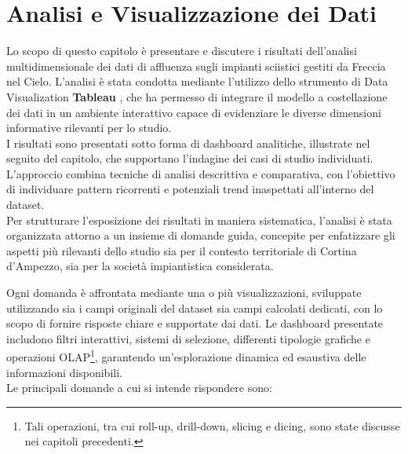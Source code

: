 \chapter{Analisi e Visualizzazione dei Dati}
\label{cha:Analisi}

Lo scopo di questo capitolo è presentare e discutere i risultati dell’analisi multidimensionale dei dati di affluenza sugli impianti sciistici gestiti da Freccia nel Cielo.
L’analisi è stata condotta mediante l’utilizzo dello strumento di Data Visualization \textbf{Tableau} \cite{Tableau}, che ha permesso di integrare il modello a costellazione dei dati in un ambiente interattivo capace di evidenziare le diverse dimensioni informative rilevanti per lo studio.\\

I risultati sono presentati sotto forma di dashboard analitiche, illustrate nel seguito del capitolo, che supportano l’indagine dei casi di studio individuati.
L’approccio combina tecniche di analisi descrittiva e comparativa, con l’obiettivo di individuare pattern ricorrenti e potenziali trend inaspettati all’interno del dataset.\\

Per strutturare l’esposizione dei risultati in maniera sistematica, l’analisi è stata organizzata attorno a un insieme di domande guida, concepite per enfatizzare gli aspetti più rilevanti dello studio sia per il contesto territoriale di Cortina d’Ampezzo, sia per la società impiantistica considerata.

Ogni domanda è affrontata mediante una o più visualizzazioni, sviluppate utilizzando sia i campi originali del dataset sia campi calcolati dedicati, con lo scopo di fornire risposte chiare e supportate dai dati. Le dashboard presentate includono filtri interattivi, sistemi di selezione, differenti tipologie grafiche e operazioni OLAP\footnote{Tali operazioni, tra cui roll-up, drill-down, slicing e dicing, sono state discusse nei capitoli precedenti.}, garantendo un’esplorazione dinamica ed esaustiva delle informazioni disponibili.\\

Le principali domande a cui si intende rispondere sono:


